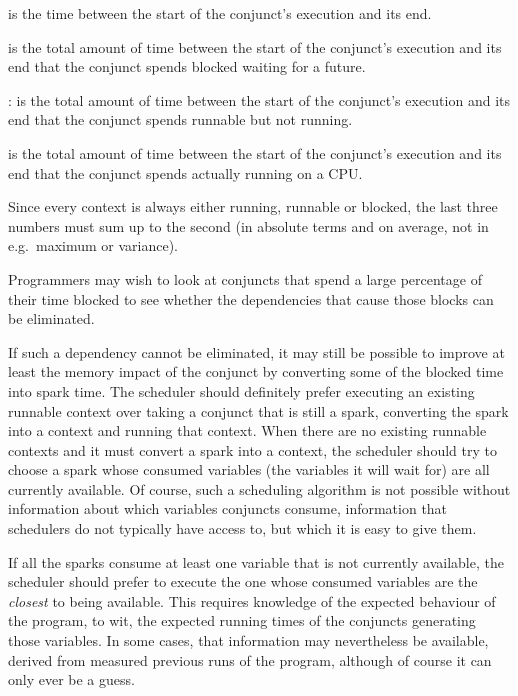 is the time between the start of the conjunct's execution and its end.

is the total amount of time
between the start of the conjunct's execution and its end
that the conjunct spends blocked waiting for a future.


:
is the total amount of time
between the start of the conjunct's execution and its end
that the conjunct spends runnable but not running.

is the total amount of time
between the start of the conjunct's execution and its end
that the conjunct spends actually running on a CPU.

Since every context is always either running, runnable or blocked,
the last three numbers must sum up to the second
(in absolute terms and on average, not in e.g.\ maximum or variance).

Programmers may wish to look at conjuncts
that spend a large percentage of their time blocked
to see whether the dependencies that cause those blocks can be eliminated.

If such a dependency cannot be eliminated,
it may still be possible to improve
at least the memory impact of the conjunct
by converting some of the blocked time into spark time.
The scheduler should definitely prefer executing an existing runnable context
over taking a conjunct that is still a spark,
converting the spark into a context and running that context.
When there are no existing runnable contexts
and it must convert a spark into a context,
the scheduler should try to choose a spark whose consumed variables
(the variables it will wait for) are all currently available.
Of course, such a scheduling algorithm is not possible
without information about which variables conjuncts consume,
information that schedulers do not typically have access to,
but which it is easy to give them.

If all the sparks consume at least one variable
that is not currently available,
the scheduler should prefer to execute the one
whose consumed variables are the \emph{closest} to being available.
This requires knowledge of the expected behaviour of the program,
to wit, the expected running times of the conjuncts generating those variables.
In some cases, that information may nevertheless be available,
derived from measured previous runs of the program,
although of course it can only ever be a guess.


